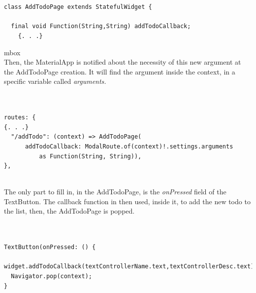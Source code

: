 \mbox{}\\
\begin{code}
\label{code:2.34}
\begin{verbatim}

class AddTodoPage extends StatefulWidget {

  final void Function(String,String) addTodoCallback;
    {. . .}
\end{verbatim}
\end{code}
mbox{}\\
Then, the MaterialApp is notified about the necessity of this new argument at the AddTodoPage creation. It will find the argument inside the context, in a specific variable called \textit{arguments.}
\mbox{}\\


\mbox{}\\
\begin{code}
\label{code:2.35}
\begin{verbatim}

routes: {
{. . .}
  "/addTodo": (context) => AddTodoPage(
      addTodoCallback: ModalRoute.of(context)!.settings.arguments
          as Function(String, String)),
},

\end{verbatim}
\end{code}
\mbox{}\\

The only part to fill in, in the AddTodoPage, is the \textit{onPressed} field of the TextButton. The callback function in then used, inside it, to add the new todo to the list, then, the AddTodoPage is popped.
\mbox{}\\


\mbox{}\\ 

\begin{code}
\label{code:2.36}
\begin{verbatim}

TextButton(onPressed: () {
  widget.addTodoCallback(textControllerName.text,textControllerDesc.text);
  Navigator.pop(context);
}
\end{verbatim}
\end{code}
\mbox{}\\

